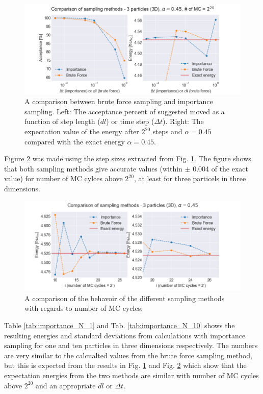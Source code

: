 \begin{figure}[H]
\center
\includegraphics[width=\linewidth]{../Results/comparison_steps_importance}\caption{A comparison between brute force sampling and importance sampling. Left: The acceptance percent of suggested moved as a function of step length ($dl$) or time step ($\Delta t$). Right: The expectation value of the energy after $2^{20}$ steps and $\alpha = 0.45$ compared with the exact energy $\alpha = 0.45$. }\label{fig:compare_importance_steps}
\end{figure}

Figure \ref{fig:compare_importance_MC} was made using the step sizes extracted from Fig. \ref{fig:compare_importance_steps}. The figure shows that both sampling methods give accurate values (within $\pm$ 0.004 of the exact value) for number of MC cylces above $2^{20}$, at least for three particels in three dimensions.

\begin{figure}[H]\caption{A comparison of the behavoir of the different sampling methods with regards to number of MC cycles.}\label{fig:compare_importance_MC}
\center
\includegraphics[width=\linewidth]{../Results/comparison_MC_importance}
\end{figure}

Table \ref{tab:importance_N_1} and Tab. \ref{tab:importance_N_10} shows the resulting energies and standard deviations from calculations with importance sampling for one and ten particles in three dimensions respectively. The numbers are very similar to the calcualted values from the brute force sampling method, but this is expected from the results in Fig. \ref{fig:compare_importance_steps} and Fig. \ref{fig:compare_importance_MC} which show that the expectation energies from the two methods are similar with number of MC cycles above $2^{20}$ and an appropriate $dl$ or $\Delta t$. 

